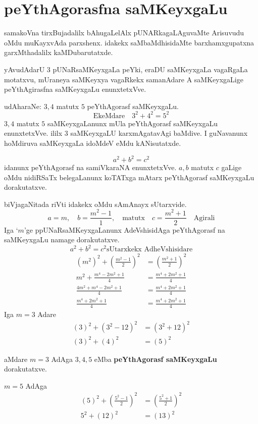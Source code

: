 \chapter{peYthAgorasfna saMKeyxgaLu}

samakoVna tirxBujadalilx bAhugaLelAlx pUNARkagaLAguvaMte Arisuvudu oMdu muKayxvAda parxshenx. idakekx saMbaMdhisidaMte barxhamxgupatxna garxMthadalilx kaMDubarutatxde.

yAvudAdarU $3$ pUNaRsaMKeyxgaLa peYki, eraDU saMKeyxgaLa vagaRgaLa motatxvu, mUraneya saMKeyxya vagaRkekx samanAdare A saMKeyxgaLige peYthAgirasfna saMKeyxgaLu enunxtetxVve.

udAharaNe: $3,4$ matutx $5$  peYthAgorasf saMKeyxgaLu.
$$
\text{EkeMdare}\quad 3^2+4^2=5^2
$$
$3,4$ matutx $5$ saMKeyxgaLanunx mUla peYthAgorasf saMKeyxgaLu enunxtetxVve. ililx $3$ saMKeyxgaLU karxmAgatavAgi baMdive. I guNavanunx hoMdiruva saMKeyxgaLa idoMdeV eMdu kANisutatxde.

$$
a^2+b^2 = c^2
$$
idanunx peYthAgorasf  na samiVkaraNA enunxtetxVve. $a,b$ matutx $c$ gaLige oMdu nidiRSaTx belegaLanunx koTATxga mAtarx peYthAgorasf saMKeyxgaLu dorakutatxve.

biVjagaNitada riVti idakekx oMdu sAmAnayx sUtarxvide.
$$
a=m, \quad b= \frac{m^2-1}{1}, \quad\text{matutx} \quad c=\frac{m^2+1}{2} \quad \text{Agirali}
$$
Iga `$m$'ge ppUNaRsaMKeyxgaLanunx AdeVshisidAga peYthAgorasf na saMKeyxgaLu namage dorakutatxve.
$$
a^2+b^2=c^2 \text{sUtarxkekx AdheVshisidare}
$$
\begin{align*}
\left(m^2\right)^2+\left(\frac{m^2-1}{2}\right)^2 &= \left(\frac{m^2+1}{2}\right)^2\\
m^2+ \frac{m^4-2m^2+1}{4} &= \frac{m^4+2m^2+1}{4}\\
\frac{4m^2+m^4-2m^2+1}{4} &= \frac{m^4+2m^2+1}{4}\\
\frac{m^4+2m^2+1}{4} &= \frac{m^4+2m^2+1}{4}
\end{align*}
Iga $m=3$ Adare
\begin{align*}
(3)^2+\left({3^2-1}{2}\right)^2 &= \left({3^2+1}{2}\right)^2\\
(3)^2+(4)^2 &= (5)^2
\end{align*}

aMdare $m=3$ AdAga $3,4,5$ eMba {\bf peYthAgorasf saMKeyxgaLu} dorakutatxve.

$m=5$ \quad AdAga
\begin{align*}
(5)^2 + \left(\frac{5^2-1}{2}\right)^2 &= \left(\frac{5^2+1}{2}\right)^2\\
5^2 +(12)^2 &= (13)^2
\end{align*}

